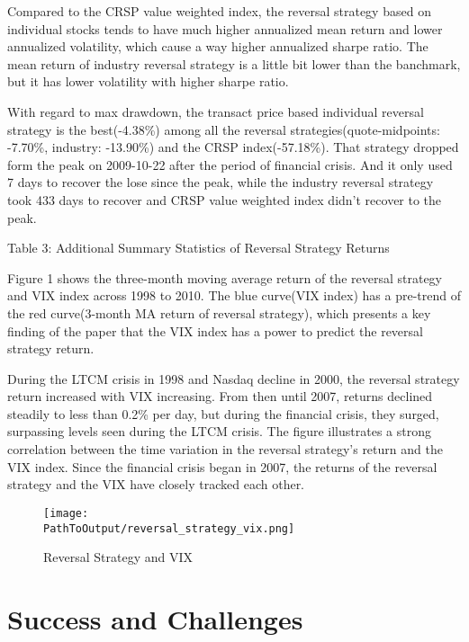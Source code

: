 \documentclass[11pt]{article}
\newcommand*{\PathToOutput}{../output/}
\begin{document}
Compared to the CRSP value weighted index, the reversal strategy based on individual 
stocks tends to have much higher annualized mean return and lower annualized volatility, 
which cause a way higher annualized sharpe ratio. The mean return of industry reversal 
strategy is a little bit lower than the banchmark, but it has lower volatility 
with higher sharpe ratio.

With regard to max drawdown, the transact price based individual reversal strategy 
is the best(-4.38\%) among all the reversal strategies(quote-midpoints: -7.70\%, 
industry: -13.90\%) and the CRSP index(-57.18\%). That strategy dropped form the 
peak on 2009-10-22 after the period of financial crisis. And it only used 7 days to 
recover the lose since the peak, while the industry reversal strategy took 433 days 
to recover and CRSP value weighted index didn't recover to the peak.

\begin{table}[h!]
    \centering
    \caption*{Table 3: Additional Summary Statistics of Reversal Strategy Returns}

    \scriptsize
    
\end{table}


Figure 1 shows the three-month moving average return of the reversal strategy 
and VIX index across 1998 to 2010. The blue curve(VIX index) has a pre-trend of 
the red curve(3-month MA return of reversal strategy), which presents a key finding 
of the paper that the VIX index has a power to predict the reversal strategy return.

During the LTCM crisis in 1998 and  Nasdaq decline in 2000, the reversal strategy 
return increased with VIX increasing. From then until 2007, returns declined steadily
to less than 0.2\% per day, but during the financial crisis, they surged, surpassing 
levels seen during the LTCM crisis. The figure illustrates a strong correlation 
between the time variation in the reversal strategy's return and the VIX index. 
Since the financial crisis began in 2007, the returns of the reversal strategy 
and the VIX have closely tracked each other.

\begin{figure}[h!]
    \centering
    \texttt{[image: \\PathToOutput/reversal\_strategy\_vix.png]}
    \caption{Reversal Strategy and VIX}
\end{figure}




\section{Success and Challenges}
\end{document}
